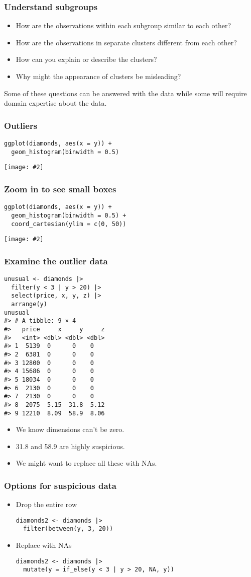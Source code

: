 \documentclass{beamer}
\newcommand{\bi}{\begin{itemize}}
\newcommand{\li}{\item}
\newcommand{\ei}{\end{itemize}}
\newcommand{\fig}[2]{\centerline{\texttt{[image: \#2]}}}
\newcommand{\bfr}[1]{\begin{frame}[fragile]\frametitle{{ #1 }}}
\begin{document}
\bfr{Understand subgroups}
\bi
\li How are the observations within each subgroup similar to each other?
\li
How are the observations in separate clusters different from each other?
\li
How can you explain or describe the clusters?
\li
Why might the appearance of clusters be misleading?
\ei

\bigskip
Some of these questions can be answered with the data while some will require domain expertise about the data.
\end{frame}


\bfr{Outliers}\scriptsize
\begin{verbatim}
ggplot(diamonds, aes(x = y)) + 
  geom_histogram(binwidth = 0.5)
\end{verbatim}
\fig{.8}{unnamed-chunk-5-1.png}
\end{frame}


\bfr{Zoom in to see small boxes}\scriptsize
\begin{verbatim}
ggplot(diamonds, aes(x = y)) + 
  geom_histogram(binwidth = 0.5) +
  coord_cartesian(ylim = c(0, 50))
\end{verbatim}
\fig{.8}{unnamed-chunk-6-1.png}
\end{frame}


\bfr{Examine the outlier data}\scriptsize
\begin{verbatim}
unusual <- diamonds |> 
  filter(y < 3 | y > 20) |> 
  select(price, x, y, z) |>
  arrange(y)
unusual
#> # A tibble: 9 × 4
#>   price     x     y     z
#>   <int> <dbl> <dbl> <dbl>
#> 1  5139  0      0    0   
#> 2  6381  0      0    0   
#> 3 12800  0      0    0   
#> 4 15686  0      0    0   
#> 5 18034  0      0    0   
#> 6  2130  0      0    0   
#> 7  2130  0      0    0   
#> 8  2075  5.15  31.8  5.12
#> 9 12210  8.09  58.9  8.06
\end{verbatim}
\bi
\li We know dimensions can't be zero.
\li 31.8 and 58.9 are highly suspicious.
\li We might want to replace all these with NAs.
\ei
\end{frame}


\bfr{Options for suspicious data}
\bi
\li Drop the entire row
\begin{verbatim}
diamonds2 <- diamonds |> 
  filter(between(y, 3, 20))
\end{verbatim}
\li Replace with NAs
\begin{verbatim}
diamonds2 <- diamonds |> 
  mutate(y = if_else(y < 3 | y > 20, NA, y))
\end{verbatim}
\ei
\end{frame}
\end{document}
